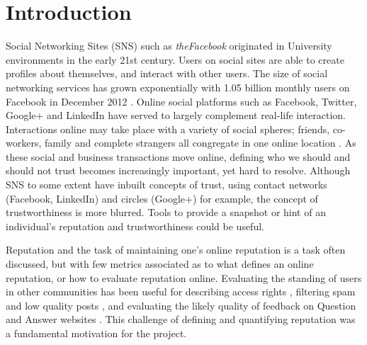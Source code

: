 \chapter{Introduction}\label{C:int}

Social Networking Sites (SNS) such as \textit{theFacebook} originated in University environments in the early 21st century. Users on social sites are able to create profiles about themselves, and interact with other users. The size of social networking services has grown exponentially with 1.05 billion monthly users on Facebook in December 2012 \cite{fb_users}. Online social platforms such as Facebook, Twitter, Google+ and LinkedIn have served to largely complement real-life interaction. Interactions online may take place with a variety of social spheres; friends, co-workers, family and complete strangers all congregate in one online location \cite{johnson2012facebook}. As these social and business transactions move online, defining who we should and should not trust becomes increasingly important, yet hard to resolve. Although SNS to some extent have inbuilt concepts of trust, using contact networks (Facebook, LinkedIn) and circles (Google+) for example, the concept of trustworthiness is more blurred. Tools to provide a snapshot or hint of an individual's reputation and trustworthiness could be useful. 


Reputation and the task of maintaining one's online reputation is a task often discussed, but with few metrics associated as to what defines an online reputation, or how to evaluate reputation online. Evaluating the standing of users in other communities has been useful for describing access rights \cite{graft_paper}, filtering spam and low quality posts \cite{josang2007survey}, and evaluating the likely quality of feedback on Question and Answer websites \cite{movshovitzanalysis}. This challenge of defining and quantifying reputation was a fundamental motivation for the project.


